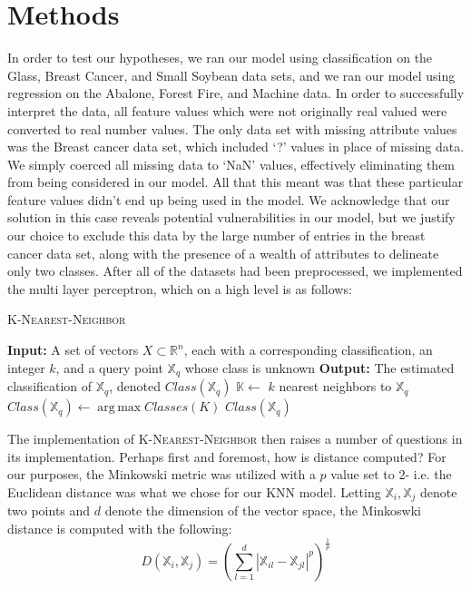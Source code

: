 \documentclass[twoside,11pt]{article}
\DeclareMathOperator*{\argmax}{arg\,max}
\begin{document}
\section{Methods}
In order to test our hypotheses, we ran our model using classification on the Glass, Breast Cancer, and Small Soybean data sets, and 
we ran our model using regression on the Abalone, Forest Fire, and Machine data. In order to successfully interpret the data, all feature values
which were not originally real valued were converted to real number values. The only data set with missing attribute values was the Breast cancer
data set, which included `?' values in place of missing data. We simply coerced all missing data to `NaN' values, effectively eliminating them from
being considered in our model. All that this meant was that these particular feature values didn't end up being used in the model. We acknowledge that our
solution in this case reveals potential vulnerabilities in our model, but we justify our choice to exclude this data by the large number of entries in the breast
cancer data set, along with the presence of a wealth of attributes to delineate only two classes. After all of the datasets had been preprocessed, we implemented the multi
layer perceptron, which on a high level is as follows:
\begin{algorithm}
\begin{algorithmic}
\caption{\textsc{K-Nearest-Neighbor}}
\STATE \textbf{Input:} A set of vectors $X \subset \mathbb{R}^n$, each with a corresponding classification, an integer $k$, and a query point $\mathbb{X}_q$ whose class is unknown
\STATE \textbf{Output:} The estimated classification of $\mathbb{X}_q$, denoted $Class(\mathbb{X}_q)$
\STATE $\mathbb{K} \gets$ $k$ nearest neighbors to $\mathbb{X}_q$
\STATE $Class(\mathbb{X}_q) \gets \argmax{Classes(K)}$ 
\STATE \RETURN $Class(\mathbb{X}_q)$
\end{algorithmic}
\end{algorithm}

The implementation of \textsc{K-Nearest-Neighbor} then raises a number of questions in its implementation. Perhaps first and foremost, how is
distance computed? For our purposes, the Minkowski metric was utilized with a $p$ value set to $2$- i.e. the Euclidean distance was
what we chose for our KNN model. Letting $\mathbb{X}_i, \mathbb{X}_j$ denote two points and $d$ denote the dimension of the vector space,
the Minkoswki distance is computed with the following:
\begin{equation}
D(\mathbb{X}_i, \mathbb{X}_j) = (\sum_{l = 1}^{d} |\mathbb{X}_{il} - \mathbb{X}_{jl}|^p)^\frac{1}{p}
\end{equation}
\end{document}
